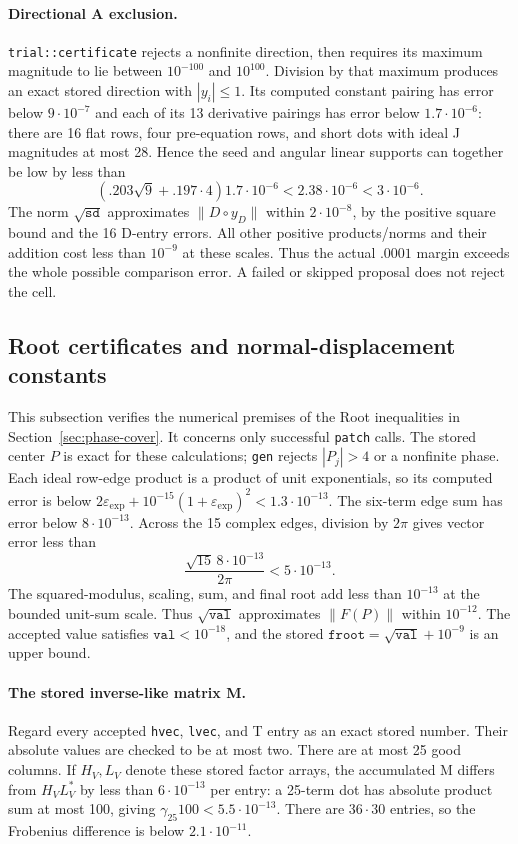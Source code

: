 \paragraph{Directional A exclusion.}
\texttt{trial::certificate} rejects a nonfinite direction, then requires
its maximum magnitude to lie between $10^{-100}$ and $10^{100}$.
Division by that maximum produces an exact stored direction with
$|y_i|\le1$.  Its computed constant pairing has error below
$9\cdot10^{-7}$ and each of its 13 derivative pairings has error below
$1.7\cdot10^{-6}$: there are 16 flat rows, four pre-equation rows,
and short dots with ideal J magnitudes at most 28.  Hence the seed and
angular linear supports can together be low by less than
\[
 (.203\sqrt9+.197\cdot4)1.7\cdot10^{-6}
   <2.38\cdot10^{-6}<3\cdot10^{-6}.
\]
The norm $\sqrt{\texttt{sd}}$ approximates
$\|D\circ y_D\|$ within $2\cdot10^{-8}$, by the positive square
bound and the 16 D-entry errors.  All other positive products/norms
and their addition cost less than $10^{-9}$ at these scales.
Thus the actual $.0001$ margin exceeds the whole possible comparison
error.  A failed or skipped proposal does not reject the cell.

\subsection{Root certificates and normal-displacement constants}
\label{round:root}

This subsection verifies the numerical premises of the Root inequalities
in Section~\ref{sec:phase-cover}.  It concerns only successful
\texttt{patch} calls.  The stored center $P$ is exact for these
calculations; \texttt{gen} rejects $|P_j|>4$ or a nonfinite phase.
Each ideal row-edge product is a product of unit exponentials, so its
computed error is below
$2\varepsilon_{\exp}+10^{-15}(1+\varepsilon_{\exp})^2
 <1.3\cdot10^{-13}$.
The six-term edge sum has error below $8\cdot10^{-13}$.
Across the 15 complex edges, division by $2\pi$ gives vector error
less than
\[
 \frac{\sqrt{15}\,8\cdot10^{-13}}{2\pi}<5\cdot10^{-13}.
\]
The squared-modulus, scaling, sum, and final root add less than
$10^{-13}$ at the bounded unit-sum scale.  Thus
$\sqrt{\texttt{val}}$ approximates $\|F(P)\|$ within $10^{-12}$.
The accepted value satisfies $\texttt{val}<10^{-18}$, and the stored
$\mathtt{froot}=\sqrt{\texttt{val}}+10^{-9}$ is an upper bound.

\paragraph{The stored inverse-like matrix M.}
Regard every accepted \texttt{hvec}, \texttt{lvec}, and T entry as an
exact stored number.  Their absolute values are checked to be at most
two.  There are at most 25 good columns.  If $H_V,L_V$ denote these
stored factor arrays, the accumulated M differs from $H_VL_V^*$ by
less than $6\cdot10^{-13}$ per entry: a 25-term dot has absolute
product sum at most 100, giving
$\gamma_{25}100<5.5\cdot10^{-13}$.
There are $36\cdot30$ entries, so the Frobenius difference is below
$2.1\cdot10^{-11}$.

